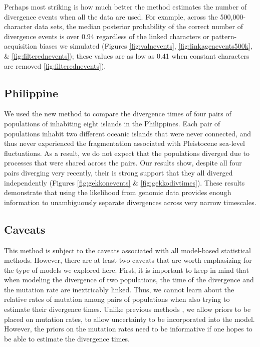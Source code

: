 Perhaps most striking is how much better the method estimates the number
of divergence events when all the data are used.
For example, across the 500,000-character data sets, the
median posterior probability of the correct number of divergence events
is over 0.94 regardless of the linked characters
or pattern-acquisition biases we simulated
(Figures
\ref{fig:valnevents},
\ref{fig:linkagenevents500k},
\&
\ref{fig:filterednevents});
these values are as low as 0.41 when constant characters are removed
\ref{fig:filterednevents}).

\subsection{Philippine }
We used the new method to compare the divergence times of four pairs
of populations of  inhabiting eight islands in the Philippines.
Each pair of populations inhabit two different oceanic islands that were never
connected, and thus never experienced the fragmentation associated with
Pleistocene sea-level fluctuations.
As a result, we do not expect that the populations diverged due to processes
that were shared across the pairs.
Our results show, despite all four pairs diverging very recently,
their is strong support that they all diverged independently
(Figures
\ref{fig:gekkonevents}
\& 
\ref{fig:gekkodivtimes}).
These results demonstrate that using the likelihood from genomic data provides
enough information to unambiguously separate divergences across very narrow
timescales.

\subsection{Caveats}
This method is subject to the caveats associated with all model-based
statistical methods.
However, there are at least two caveats that are worth emphasizing for the type
of models we explored here.
First, it is important to keep in mind that when modeling the divergence of two
populations, the time of the divergence and the mutation rate are inextricably
linked.
Thus, we cannot learn about the relative rates of mutation among pairs of
populations when also trying to estimate their divergence times.
Unlike previous methods \citep{Hickerson2006,Huang2011,Oaks2014dpp},
we allow priors to be placed on mutation rates, to allow uncertainty
to be incorporated into the model.
However, the priors on the mutation rates need to be informative if one hopes
to be able to estimate the divergence times.

